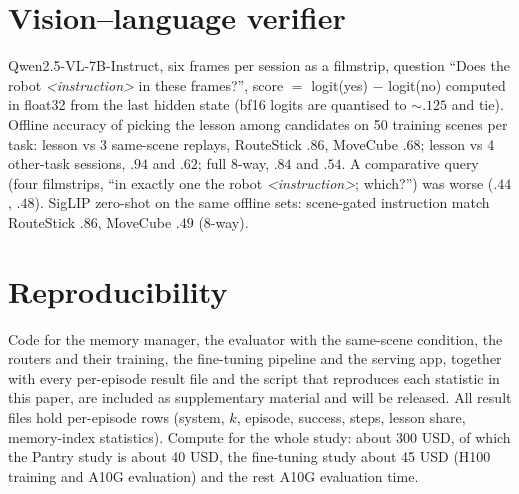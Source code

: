 \documentclass{article}
\newcommand{\sys}[1]{\textsc{#1}}
\newif\ifanon \anontrue
\providecommand{\ctrlroot}{}
\begin{document}
\begin{table}[h]
\centering\footnotesize\setlength{\tabcolsep}{4pt}
\caption{Fine-tuned models under the released sampler ($n{=}50$, test split): success at $k{=}0$ and $k{=}7$, the paired gap between them, and the paired change at $k{=}7$ against \sys{control} (Bonett--Price 95\% intervals).}
\label{tab:ftgap}

\end{table}

\section{Vision--language verifier}
\label{app:vlm}
Qwen2.5-VL-7B-Instruct, six frames per session as a filmstrip, question ``Does the robot \textit{<instruction>} in these frames?'', score $=$ logit(yes) $-$ logit(no) computed in float32 from the last hidden state (bf16 logits are quantised to ${\sim}.125$ and tie). Offline accuracy of picking the lesson among candidates on 50 training scenes per task: lesson vs 3 same-scene replays, RouteStick $.86$, MoveCube $.68$; lesson vs 4 other-task sessions, $.94$ and $.62$; full 8-way, $.84$ and $.54$. A comparative query (four filmstrips, ``in exactly one the robot \textit{<instruction>}; which?'') was worse ($.44$, $.48$). SigLIP zero-shot on the same offline sets: scene-gated instruction match RouteStick $.86$, MoveCube $.49$ (8-way).



\section{Reproducibility}
Code for the memory manager, the evaluator with the same-scene condition, the routers and their training, the fine-tuning pipeline and the serving app, together with every per-episode result file and the script that reproduces each statistic in this paper, are \ifanon included as supplementary material and will be released\else at \url{https://github.com/hanshaunlee/blame-the-bowl}\fi. All result files hold per-episode rows (system, $k$, episode, success, steps, lesson share, memory-index statistics). Compute for the whole study: about 300 USD, of which the Pantry study is about 40 USD, the fine-tuning study about 45 USD (H100 training and A10G evaluation) and the rest A10G evaluation time.
\end{document}
